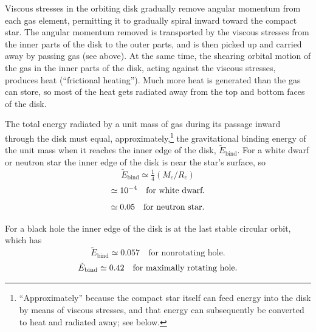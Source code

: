 


Viscous stresses in the orbiting disk gradually remove angular momentum
from each gas element, permitting it to gradually spiral inward toward the
compact star. The angular momentum removed is transported by the viscous
stresses from the inner parts of the disk to the outer parts, and is then picked
up and carried away by passing gas (see above). At the same time, the shearing
orbital motion of the gas in the inner parts of the disk, acting against the
viscous stresses, produces heat (``frictional heating''). Much more heat is
generated than the gas can store, so most of the heat gets radiated away from
the top and bottom faces of the disk.

The total energy radiated by a unit mass of gas during its passage inward
through the disk must equal, approximately,\footnote{``Approximately'' because the compact star itself can feed energy into the disk by means
of viscous stresses, and that energy can subsequently be converted to heat and radiated
away; see below.} the gravitational binding energy
of the unit mass when it reaches the inner edge of the disk, $\tilde{E}_{\text{bind}}$. For a white
dwarf or neutron star the inner edge of the disk is near the star's surface, so
\begin{equation}
\tilde{E}_{\text{bind}} \simeq \tfrac{1}{4}(M_c/R_c)
\tag{5.2.9a}
\end{equation}
\begin{equation}
\simeq 10^{-4} \quad \text{for white dwarf}.
\notag
\end{equation}
\begin{equation}
\simeq 0.05 \quad \text{for neutron star}.
\notag
\end{equation}

For a black hole the inner edge of the disk is at the last stable circular orbit,
which has
\begin{equation}
\tilde{E}_{\text{bind}} \simeq 0.057 \quad \text{for nonrotating hole}.
\tag{5.2.9b}
\end{equation}
\begin{equation}
\tilde{E}_{\text{bind}} \simeq 0.42 \quad \text{for maximally rotating hole}.
\notag
\end{equation}

